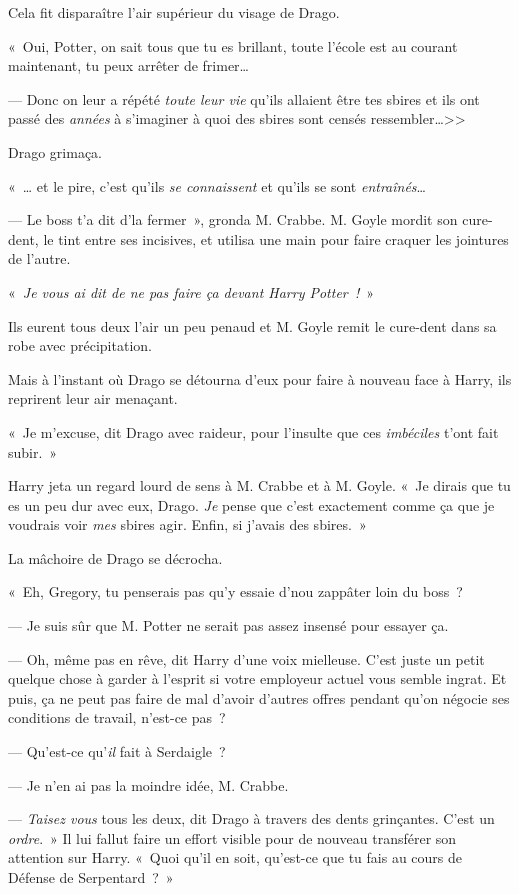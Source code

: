 Cela fit disparaître l'air supérieur du visage de Drago.

«~Oui, Potter, on sait tous que tu es brillant, toute l'école est au courant maintenant, tu peux arrêter de frimer…

--- Donc on leur a répété \emph{toute leur vie} qu'ils allaient être tes sbires et ils ont passé des \emph{années} à s'imaginer à quoi des sbires sont censés ressembler…>>

Drago grimaça.

«~… et le pire, c'est qu'ils \emph{se connaissent} et qu'ils se sont \emph{entraînés}…

--- Le boss t'a dit d'la fermer~», gronda M. Crabbe. M. Goyle mordit son cure-dent, le tint entre ses incisives, et utilisa une main pour faire craquer les jointures de l'autre.

«~\emph{Je vous ai dit de ne pas faire ça devant Harry Potter~!}~»

Ils eurent tous deux l'air un peu penaud et M. Goyle remit le cure-dent dans sa robe avec précipitation.

Mais à l'instant où Drago se détourna d'eux pour faire à nouveau face à Harry, ils reprirent leur air menaçant.

«~Je m'excuse, dit Drago avec raideur, pour l'insulte que ces \emph{imbéciles} t'ont fait subir.~»

Harry jeta un regard lourd de sens à M. Crabbe et à M. Goyle. «~Je dirais que tu es un peu dur avec eux, Drago. \emph{Je} pense que c'est exactement comme ça que je voudrais voir \emph{mes} sbires agir. Enfin, si j'avais des sbires.~»

La mâchoire de Drago se décrocha.

«~Eh, Gregory, tu penserais pas qu'y essaie d'nou zappâter loin du boss~?

--- Je suis sûr que M. Potter ne serait pas assez insensé pour essayer ça.

--- Oh, même pas en rêve, dit Harry d'une voix mielleuse. C'est juste un petit quelque chose à garder à l'esprit si votre employeur actuel vous semble ingrat. Et puis, ça ne peut pas faire de mal d'avoir d'autres offres pendant qu'on négocie ses conditions de travail, n'est-ce pas~?

--- Qu'est-ce qu'\emph{il} fait à Serdaigle~?

--- Je n'en ai pas la moindre idée, M. Crabbe.

--- \emph{Taisez vous} tous les deux, dit Drago à travers des dents grinçantes. C'est un \emph{ordre}.~» Il lui fallut faire un effort visible pour de nouveau transférer son attention sur Harry. «~Quoi qu'il en soit, qu'est-ce que tu fais au cours de Défense de Serpentard~?~»

